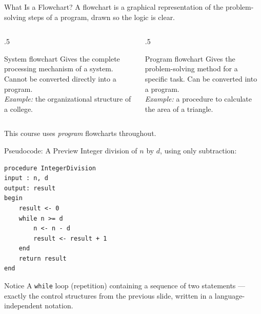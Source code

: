 \documentclass[9pt,aspectratio=169,xcolor=table]{beamer}
\begin{document}
\begin{frame}{What Is a Flowchart?}
    \leavevmode
    A \alert{flowchart} is a graphical representation of the
    problem-solving steps of a program, drawn so the logic is clear.

    \vspace{2mm}
    \begin{columns}[t]
        \begin{column}{.5\textwidth}
            \begin{block}{System flowchart}
                \small Gives the complete processing mechanism of a
                system. \alert{Cannot} be converted directly into a
                program. \\[1mm]
                \emph{Example:} the organizational structure of a
                college.
            \end{block}
        \end{column}
        \begin{column}{.5\textwidth}
            \begin{block}{Program flowchart}
                \small Gives the problem-solving method for a specific
                task. \alert{Can} be converted into a program. \\[1mm]
                \emph{Example:} a procedure to calculate the area of a
                triangle.
            \end{block}
        \end{column}
    \end{columns}

    \vspace{3mm}
    {\small This course uses \emph{program} flowcharts throughout.}
\end{frame}

\begin{frame}[fragile]{Pseudocode: A Preview}
    \leavevmode
    Integer division of $n$ by $d$, using only subtraction:

\begin{lstlisting}[language={}]
procedure IntegerDivision
input : n, d
output: result
begin
    result <- 0
    while n >= d
        n <- n - d
        result <- result + 1
    end
    return result
end
\end{lstlisting}

    \vspace{2mm}
    \begin{block}{Notice}
        A \texttt{while} loop (repetition) containing a sequence of two
        statements --- exactly the control structures from the previous
        slide, written in a language-independent notation.
    \end{block}
\end{frame}
\end{document}
